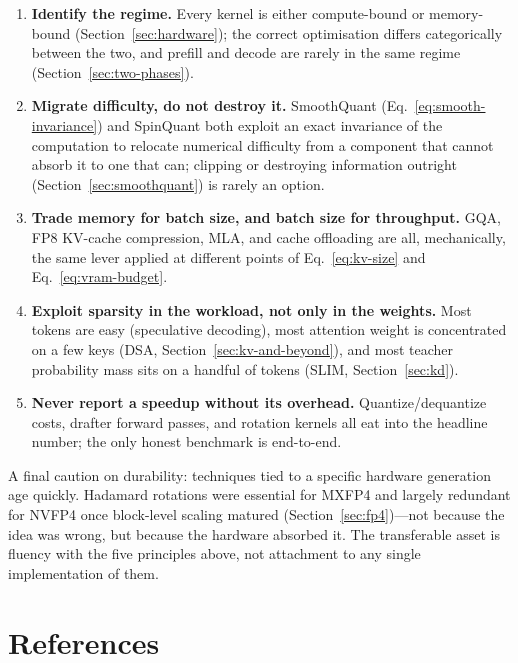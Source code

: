 \documentclass[11pt,a4paper]{article}
\theoremstyle{definition}
\theoremstyle{remark}
\theoremstyle{plain}
\begin{document}
\begin{enumerate}[leftmargin=1.8em, itemsep=2pt]
  \item \textbf{Identify the regime.} Every kernel is either compute-bound
        or memory-bound (Section~\ref{sec:hardware}); the correct
        optimisation differs categorically between the two, and prefill
        and decode are rarely in the same regime
        (Section~\ref{sec:two-phases}).
  \item \textbf{Migrate difficulty, do not destroy it.} SmoothQuant
        (Eq.~\eqref{eq:smooth-invariance}) and SpinQuant both exploit an
        exact invariance of the computation to relocate numerical
        difficulty from a component that cannot absorb it to one that can;
        clipping or destroying information outright
        (Section~\ref{sec:smoothquant}) is rarely an option.
  \item \textbf{Trade memory for batch size, and batch size for
        throughput.} GQA, FP8 KV-cache compression, MLA, and cache
        offloading are all, mechanically, the same lever applied at
        different points of Eq.~\eqref{eq:kv-size} and
        Eq.~\eqref{eq:vram-budget}.
  \item \textbf{Exploit sparsity in the workload, not only in the
        weights.} Most tokens are easy (speculative decoding), most
        attention weight is concentrated on a few keys (DSA,
        Section~\ref{sec:kv-and-beyond}), and most teacher probability mass
        sits on a handful of tokens (SLIM, Section~\ref{sec:kd}).
  \item \textbf{Never report a speedup without its overhead.}
        Quantize/dequantize costs, drafter forward passes, and rotation
        kernels all eat into the headline number; the only honest
        benchmark is end-to-end.
\end{enumerate}

A final caution on durability: techniques tied to a specific hardware
generation age quickly. Hadamard rotations were essential for MXFP4 and
largely redundant for NVFP4 once block-level scaling matured
(Section~\ref{sec:fp4})---not because the idea was wrong, but because the
hardware absorbed it. The transferable asset is fluency with the five
principles above, not attachment to any single implementation of them.

\section{References}
\label{sec:refs}
\end{document}
